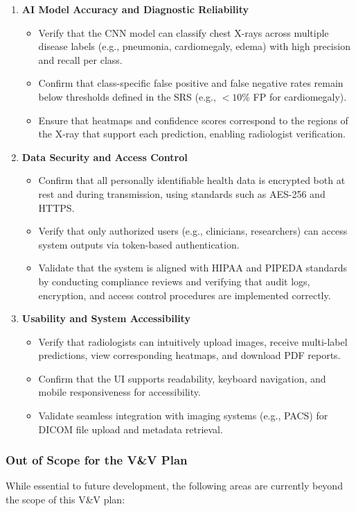\documentclass[12pt, titlepage]{article}
\begin{document}
\begin{enumerate}
  \item \textbf{AI Model Accuracy and Diagnostic Reliability}
    \begin{itemize}
      \item Verify that the CNN model can classify chest X-rays across multiple disease labels (e.g., pneumonia, cardiomegaly, edema) with high precision and recall per class.
      \item Confirm that class-specific false positive and false negative rates remain below thresholds defined in the SRS (e.g., $ <10\%$ FP for cardiomegaly).
      \item Ensure that heatmaps and confidence scores correspond to the regions of the X-ray that support each prediction, enabling radiologist verification.
    \end{itemize}
  \item \textbf{Data Security and Access Control}
    \begin{itemize}
      \item Confirm that all personally identifiable health data is encrypted both at rest and during transmission, using standards such as AES-256 and HTTPS.
      \item Verify that only authorized users (e.g., clinicians, researchers) can access system outputs via token-based authentication.
      \item Validate that the system is aligned with HIPAA and PIPEDA standards by conducting compliance reviews and verifying that audit logs, encryption, and access control procedures are implemented correctly.
    \end{itemize}
  \item \textbf{Usability and System Accessibility}
    \begin{itemize}
      \item Verify that radiologists can intuitively upload images, receive multi-label predictions, view corresponding heatmaps, and download PDF reports.
      \item Confirm that the UI supports readability, keyboard navigation, and mobile responsiveness for accessibility.
      \item Validate seamless integration with imaging systems (e.g., PACS) for DICOM file upload and metadata retrieval.
    \end{itemize}
\end{enumerate}

\subsubsection{Out of Scope for the V\&V Plan}
While essential to future development, the following areas are currently beyond the scope of this V\&V plan:
\end{document}
